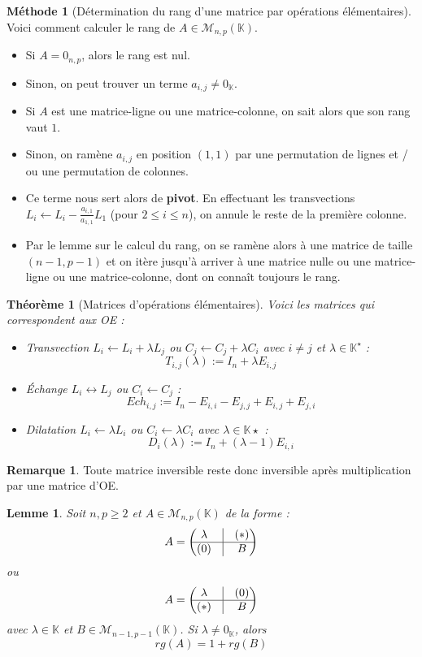 \documentclass[french]{book}
\newcommand{\K}{\mathbb{K}}
\newcommand{\st}{^\star}
\theoremstyle{plain}
\newtheorem{thm}{Théorème}[chapter]
\newtheorem{lem}{Lemme}[chapter]
\theoremstyle{definition}
\newtheorem{rmq}{Remarque}[chapter]
\newtheorem{met}{Méthode}[chapter]
\theoremstyle{remark}
\begin{document}
\begin{met}[Détermination du rang d'une matrice par opérations élémentaires]
	Voici comment calculer le rang de $A\in\mathcal{M}_{n,p}(\K)$.
	\begin{itemize}
		\item Si $A=0_{n,p}$, alors le rang est nul.
		\item Sinon, on peut trouver un terme $a_{i,j}\ne0_\K$.
		\item Si $A$ est une matrice-ligne ou une matrice-colonne, on sait alors que son rang vaut $1$.
		\item Sinon, on ramène $a_{i,j}$ en position $(1,1)$ par une permutation de lignes et / ou une permutation de colonnes.
		\item Ce terme nous sert alors de \textbf{pivot}. En effectuant les transvections $L_i\leftarrow L_i-\displaystyle\frac{a_{i,1}}{a_{1,1}}L_1$ (pour $2\leqslant i\leqslant n$), on annule le reste de la première colonne.
		\item Par le lemme sur le calcul du rang, on se ramène alors à une matrice de taille $(n-1,p-1)$ et on itère jusqu'à arriver à une matrice nulle ou une matrice-ligne ou une matrice-colonne, dont on connaît toujours le rang.
	\end{itemize}
\end{met}
\begin{thm}[Matrices d'opérations élémentaires]
	Voici les matrices qui correspondent aux OE : \begin{itemize}
		\item Transvection $L_i\leftarrow L_i+\lambda L_j$ ou $C_j\leftarrow C_j+\lambda C_i$ avec $i\ne j$ et $\lambda\in\K\st$ : $$T_{i,j}(\lambda):=I_n+\lambda E_{i,j}$$
		\item Échange $L_i\leftrightarrow L_j$ ou $C_i\leftarrow C_j$ : $$Ech_{i,j}:=I_n-E_{i,i}-E_{j,j}+E_{i,j}+E_{j,i}$$
		\item Dilatation $L_i\leftarrow \lambda L_i$ ou $C_i\leftarrow\lambda C_i$ avec $\lambda\in\K\star$ : $$D_i(\lambda):=I_n+(\lambda-1)E_{i,i}$$
	\end{itemize}
\end{thm}
\begin{rmq}
	Toute matrice inversible reste donc inversible après multiplication par une matrice d'OE.
\end{rmq}
\begin{lem}
	Soit $n,p\geqslant2$ et $A\in\mathcal{M}_{n,p}(\K)$ de la forme : $$A=\begin{pmatrix}\lambda&\vline&(*)\\ \hline (0)&\vline&B\end{pmatrix}$$
	ou $$A=\begin{pmatrix}\lambda&\vline&(0)\\ \hline (*)&\vline&B\end{pmatrix}$$ avec $\lambda\in\K$ et $B\in\mathcal{M}_{n-1,p-1}(\K)$. Si $\lambda\ne0_\K$, alors $$rg(A)=1+rg(B)$$
\end{lem}
\end{document}
